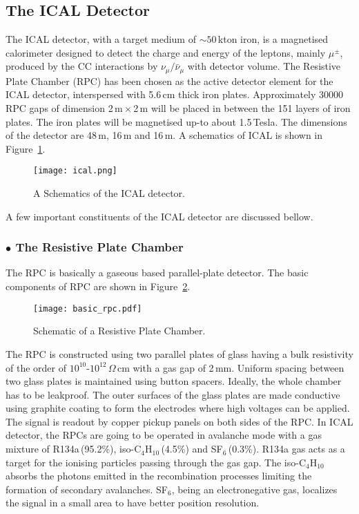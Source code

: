 \subsection{The ICAL Detector}
The ICAL detector, with a target medium of $\sim 50$\,kton iron, is a magnetised calorimeter designed to detect the charge and energy of the leptons, mainly $\mu^{\pm}$, produced by the CC interactions by $\nu_{\mu}/\bar{\nu}_{\mu}$ with detector volume. The Resistive Plate Chamber (RPC) has been chosen as the active detector element for the ICAL detector, interspersed with 5.6\,cm thick iron plates. Approximately 30000 RPC gaps of dimension 2\,m\,$\times$\,2\,m will be placed in between the 151 layers of iron plates. The iron plates will be magnetised up-to about 1.5\,Tesla. The dimensions of the detector are 48\,m, 16\,m and 16\,m. A schematics of ICAL is shown in Figure~\ref{fig:icalsk}. 
\begin{figure}[h]
  \centering
  \texttt{[image: ical.png]}
  \caption{A Schematics of the ICAL detector\cite{inoreport}.}
  \label{fig:icalsk}
\end{figure}
A few important constituents of the ICAL detector are discussed bellow.

\subsubsection*{$\bullet$ The Resistive Plate Chamber}
The RPC is basically a gaseous based parallel-plate detector\cite{rpc_p2}. The basic components of RPC are shown in Figure~\ref{fig:rpc}. 
\begin{figure}[h]
  \centering
  \texttt{[image: basic\_rpc.pdf]}
  \caption{Schematic of a Resistive Plate Chamber.}
  \label{fig:rpc}
\end{figure}
The RPC is constructed using two parallel plates of glass having a
bulk resistivity of the order of $10^{10}$-$10^{12}$\,$\Omega$\,cm with
a gas gap of 2\,mm. Uniform spacing between two glass plates is
maintained using button spacers. Ideally, the whole chamber has to be
leakproof. The outer surfaces of the glass plates are made conductive
using graphite coating to form the electrodes where high voltages can
be applied. The signal is readout by copper pickup panels on both
sides of the RPC. In ICAL detector, the RPCs are going to be operated
in avalanche mode with a gas mixture of R134a\,(95.2\%),
iso-C$_4$H$_{10}$\,(4.5\%) and SF$_6$\,(0.3\%). R134a gas acts as a
target for the ionising particles passing through the gas gap. The
iso-C$_4$H$_{10}$ absorbs the photons emitted in the recombination
processes limiting the formation of secondary avalanches. SF$_6$,
being an electronegative gas, localizes the signal in a small area to
have better position resolution.

